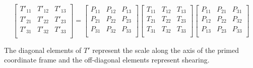 \begin{equation}
  \left[{\begin{matrix} 
        T'_{11} & T'_{12} & T'_{13} \\ 
        T'_{21} & T'_{22} & T'_{23} \\ 
        T'_{31} & T'_{32} & T'_{33} \\ 
      \end{matrix}}\right]
  =
  \left[{\begin{matrix}
        P_{11} & P_{12} & P_{13} \\ 
        P_{21} & P_{22} & P_{23} \\
        P_{31} & P_{32} & P_{33} \\ 
      \end{matrix}}\right]
  \left[{\begin{matrix} 
        T_{11} & T_{12} & T_{13} \\ 
        T_{21} & T_{22} & T_{23} \\ 
        T_{31} & T_{32} & T_{33} \\ 
      \end{matrix}}\right]
  \left[{\begin{matrix} 
        P_{11} & P_{21} & P_{31} \\ 
        P_{12} & P_{22} & P_{32} \\ 
        P_{13} & P_{23} & P_{33} \\ 
      \end{matrix}}\right]
\end{equation}

The diagonal elements of $T'$ represent the scale along the axis of
the primed coordinate frame and the off-diagonal elements represent
shearing.






